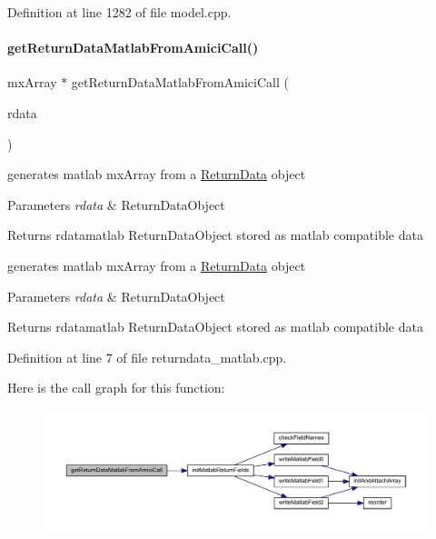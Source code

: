 Definition at line 1282 of file model.\+cpp.

\mbox{\label{namespaceamici_a698409f4b9ce06055bcebcee39f81a91}} 
\paragraph{\texorpdfstring{get\+Return\+Data\+Matlab\+From\+Amici\+Call()}{getReturnDataMatlabFromAmiciCall()}}
{\footnotesize\ttfamily mx\+Array $\ast$ get\+Return\+Data\+Matlab\+From\+Amici\+Call (\begin{DoxyParamCaption}\item[{\mbox{\hyperlink{classamici_1_1_return_data}{Return\+Data}} const $\ast$}]{rdata }\end{DoxyParamCaption})}

generates matlab mx\+Array from a \mbox{\hyperlink{classamici_1_1_return_data}{Return\+Data}} object 
\begin{DoxyParams}{Parameters}
{\em rdata} & Return\+Data\+Object \\
\hline
\end{DoxyParams}
\begin{DoxyReturn}{Returns}
rdatamatlab Return\+Data\+Object stored as matlab compatible data
\end{DoxyReturn}
generates matlab mx\+Array from a \mbox{\hyperlink{classamici_1_1_return_data}{Return\+Data}} object 
\begin{DoxyParams}{Parameters}
{\em rdata} & Return\+Data\+Object \\
\hline
\end{DoxyParams}
\begin{DoxyReturn}{Returns}
rdatamatlab Return\+Data\+Object stored as matlab compatible data
\end{DoxyReturn}


Definition at line 7 of file returndata\+\_\+matlab.\+cpp.

Here is the call graph for this function\+:
\nopagebreak
\begin{figure}[H]
\begin{center}
\leavevmode
\includegraphics[width=350pt]{namespaceamici_a698409f4b9ce06055bcebcee39f81a91_cgraph}
\end{center}
\end{figure}
\mbox{\label{namespaceamici_a7449834fca1e0bde53d5f73ae0d2b929}} 
